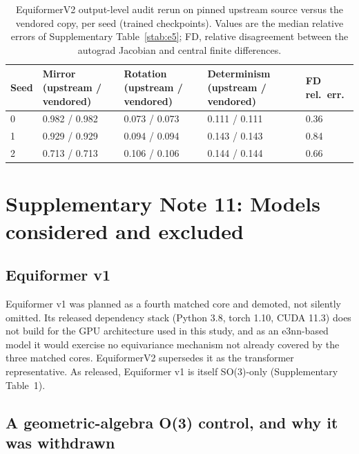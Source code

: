 \begin{table}[htbp]
\centering
\small
\caption{EquiformerV2 output-level audit rerun on pinned upstream source versus the vendored copy, per seed (trained checkpoints). Values are the median relative errors of Supplementary Table~\ref{stab:e5}; FD, relative disagreement between the autograd Jacobian and central finite differences.}
\label{stab:h1}
\begin{tabular}{lllll}
\toprule
Seed & Mirror (upstream / vendored) & Rotation (upstream / vendored) & Determinism (upstream / vendored) & FD rel.\ err. \\
\midrule
0 & 0.982 / 0.982 & 0.073 / 0.073 & 0.111 / 0.111 & 0.36 \\
1 & 0.929 / 0.929 & 0.094 / 0.094 & 0.143 / 0.143 & 0.84 \\
2 & 0.713 / 0.713 & 0.106 / 0.106 & 0.144 / 0.144 & 0.66 \\
\bottomrule
\end{tabular}
\end{table}

\section*{Supplementary Note 11: Models considered and excluded}

\subsection*{Equiformer v1}

Equiformer v1 was planned as a fourth matched core and demoted, not silently omitted. Its released dependency stack (Python 3.8, torch 1.10, CUDA 11.3) does not build for the GPU architecture used in this study, and as an e3nn-based model it would exercise no equivariance mechanism not already covered by the three matched cores. EquiformerV2 supersedes it as the transformer representative. As released, Equiformer v1 is itself SO(3)-only (Supplementary Table~1).

\subsection*{A geometric-algebra O(3) control, and why it was withdrawn}

